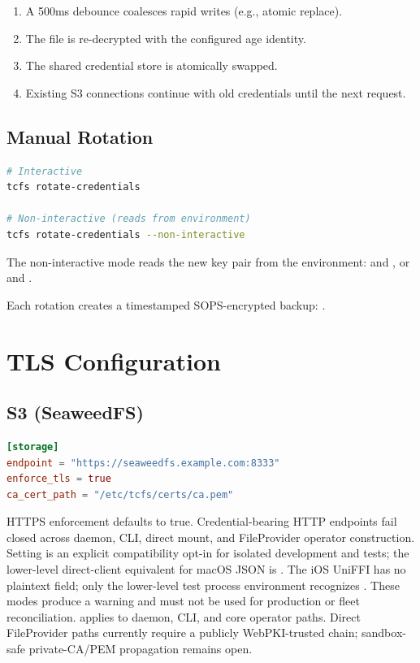 \documentclass[11pt,a4paper]{article}
\begin{document}
\begin{enumerate}
  \item A 500ms debounce coalesces rapid writes (e.g., atomic replace).
  \item The file is re-decrypted with the configured age identity.
  \item The shared credential store is atomically swapped.
  \item Existing S3 connections continue with old credentials until the next
        request.
\end{enumerate}

\subsection{Manual Rotation}

\begin{lstlisting}[language=bash]
# Interactive
tcfs rotate-credentials

# Non-interactive (reads from environment)
tcfs rotate-credentials --non-interactive
\end{lstlisting}

The non-interactive mode reads the new key pair from the environment:
 and , or
 and .

Each rotation creates a timestamped SOPS-encrypted backup:
.

\section{TLS Configuration}

\subsection{S3 (SeaweedFS)}

\begin{lstlisting}[language=toml]
[storage]
endpoint = "https://seaweedfs.example.com:8333"
enforce_tls = true
ca_cert_path = "/etc/tcfs/certs/ca.pem"
\end{lstlisting}

HTTPS enforcement defaults to true. Credential-bearing HTTP endpoints fail
closed across daemon, CLI, direct mount, and FileProvider operator
construction. Setting  is an explicit compatibility
opt-in for isolated development and tests; the lower-level direct-client
equivalent for macOS JSON is . The iOS
UniFFI  has no plaintext field; only the lower-level test
process environment recognizes
. These modes produce a warning
and must not be used for production or fleet reconciliation.
 applies to daemon, CLI, and core operator paths. Direct
FileProvider paths currently require a publicly WebPKI-trusted chain;
sandbox-safe private-CA/PEM propagation remains open.
\end{document}

